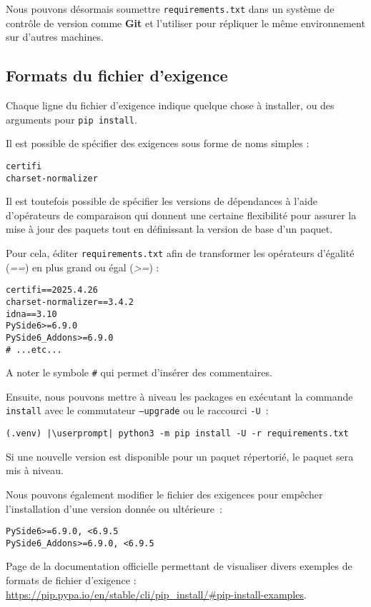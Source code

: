 Nous pouvons désormais soumettre \texttt{requirements.txt} dans un système de contrôle de version comme \textbf{Git} et l’utiliser pour répliquer le même environnement sur d’autres machines.

\subsection*{Formats du fichier d'exigence}
Chaque ligne du fichier d'exigence indique quelque chose à installer, ou des arguments pour \texttt{pip install}.

Il est possible de spécifier des exigences sous forme de noms simples :
\begin{lstlisting}[style=file]
certifi
charset-normalizer
\end{lstlisting}

Il est toutefois possible de spécifier les versions de dépendances à l’aide d’opérateurs de comparaison qui donnent une certaine flexibilité pour assurer la mise à jour des paquets tout en définissant la version de base d’un paquet.

Pour cela, éditer \texttt{requirements.txt} afin de transformer les opérateurs d’égalité (\textit{==}) en plus grand ou égal  (\textit{>=}) :
\begin{lstlisting}[style=file]
certifi==2025.4.26
charset-normalizer==3.4.2
idna==3.10
PySide6>=6.9.0
PySide6_Addons>=6.9.0
# ...etc...
\end{lstlisting}

A noter le symbole \texttt{\#} qui permet d'insérer des commentaires.

Ensuite, nous pouvons mettre à niveau les packages en exécutant la commande \texttt{install} avec le commutateur \texttt{--upgrade} ou le raccourci \texttt{-U} :
\begin{lstlisting}[style=bash]
(.venv) |\userprompt| python3 -m pip install -U -r requirements.txt
\end{lstlisting}

Si une nouvelle version est disponible pour un paquet répertorié, le paquet sera mis à niveau.

Nous pouvons également modifier le fichier des exigences pour empêcher l’installation d'une version donnée ou ultérieure :
\begin{lstlisting}[style=file]
PySide6>=6.9.0, <6.9.5
PySide6_Addons>=6.9.0, <6.9.5
\end{lstlisting}

Page de la documentation officielle permettant de visualiser divers exemples de formats de fichier d'exigence : \url{https://pip.pypa.io/en/stable/cli/pip_install/#pip-install-examples}.


